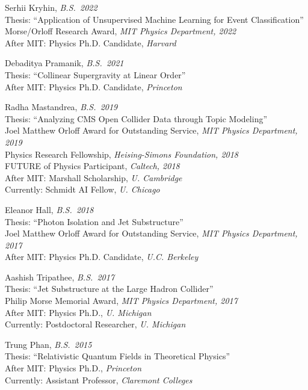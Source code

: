 \bbl

\item Serhii Kryhin, \emph{B.S.~2022}
\\ Thesis: ``Application of Unsupervised Machine Learning for Event Classification''
\\ Morse/Orloff Research Award, \emph{MIT Physics Department, 2022}
\\ After MIT: Physics Ph.D. Candidate, \emph{Harvard}

\item Debaditya Pramanik, \emph{B.S.~2021}
\\ Thesis: ``Collinear Supergravity at Linear Order''
\\ After MIT: Physics Ph.D. Candidate, \emph{Princeton}

\item Radha Mastandrea, \emph{B.S.~2019}
\\ Thesis: ``Analyzing CMS Open Collider Data through Topic Modeling''
\\ Joel Matthew Orloff Award for Outstanding Service, \emph{MIT Physics Department, 2019}
\\ Physics Research Fellowship, \emph{Heising-Simons Foundation, 2018}
\\ FUTURE of Physics Participant, \emph{Caltech, 2018}
\\ After MIT: Marshall Scholarship, \emph{U. Cambridge}
\\ Currently: Schmidt AI Fellow, \emph{U. Chicago}

\item Eleanor Hall, \emph{B.S.~2018}
\\ Thesis: ``Photon Isolation and Jet Substructure''
\\ Joel Matthew Orloff Award for Outstanding Service, \emph{MIT Physics Department, 2017}
\\ After MIT: Physics Ph.D. Candidate, \emph{U.C. Berkeley}

\item Aashish Tripathee, \emph{B.S.~2017}
\\ Thesis: ``Jet Substructure at the Large Hadron Collider''
\\ Philip Morse Memorial Award, \emph{MIT Physics Department, 2017}
\\ After MIT: Physics Ph.D., \emph{U. Michigan}
\\ Currently: Postdoctoral Researcher, \emph{U. Michigan}

\item Trung Phan, \emph{B.S.~2015}
\\ Thesis: ``Relativistic Quantum Fields in Theoretical Physics''
\\ After MIT: Physics Ph.D., \emph{Princeton}
\\ Currently: Assistant Professor, \emph{Claremont Colleges}

